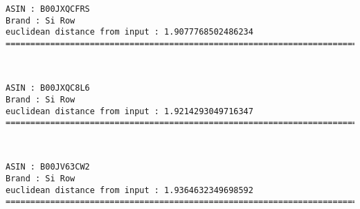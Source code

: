 \documentclass[11pt]{article}
\begin{document}
    \begin{Verbatim}[commandchars=\\\{\}]
ASIN : B00JXQCFRS
Brand : Si Row
euclidean distance from input : 1.9077768502486234
=============================================================================================================================

    \end{Verbatim}

    
    
    \begin{center}
    \end{center}
    { \hspace*{\fill} \\}
    
    \begin{Verbatim}[commandchars=\\\{\}]
ASIN : B00JXQC8L6
Brand : Si Row
euclidean distance from input : 1.9214293049716347
=============================================================================================================================

    \end{Verbatim}

    
    
    \begin{center}
    \end{center}
    { \hspace*{\fill} \\}
    
    \begin{Verbatim}[commandchars=\\\{\}]
ASIN : B00JV63CW2
Brand : Si Row
euclidean distance from input : 1.9364632349698592
=============================================================================================================================

    \end{Verbatim}

    
    
    \begin{center}
    \end{center}
    { \hspace*{\fill} \\}
    
\end{document}
